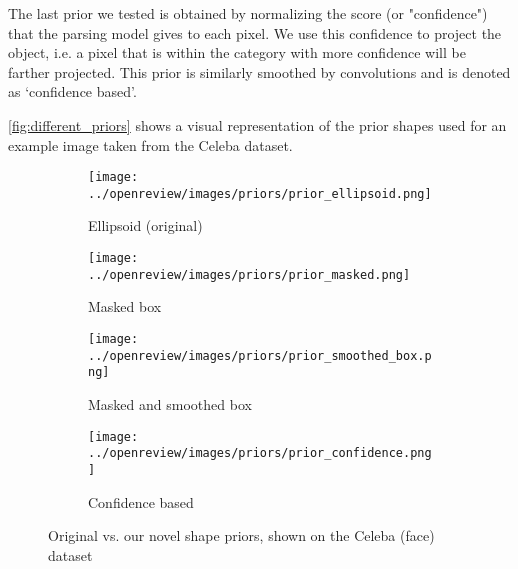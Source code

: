 The last prior we tested is obtained by normalizing the score (or "confidence") that the parsing model gives to each pixel. We use this confidence to project the object, i.e. a pixel that is within the category with more confidence will be farther projected. This prior is similarly smoothed by convolutions and is denoted as `confidence based'. 

\autoref{fig:different_priors} shows a visual representation of the prior shapes used for an example image taken from the Celeba dataset.
\begin{figure}[!htb]
\centering
\begin{subfigure}[t]{0.20\textwidth}
    \texttt{[image: ../openreview/images/priors/prior\_ellipsoid.png]}
    \caption{Ellipsoid (original)}
    \label{}
\end{subfigure}
\begin{subfigure}[t]{0.20\textwidth}
    \texttt{[image: ../openreview/images/priors/prior\_masked.png]}
    \caption{Masked box}
    \label{}
\end{subfigure}
\begin{subfigure}[t]{0.20\textwidth}
    \texttt{[image: ../openreview/images/priors/prior\_smoothed\_box.png]}
    \caption{Masked and  smoothed box
    }
    \label{subfig:c}
\end{subfigure}
\begin{subfigure}[t]{0.20\textwidth}
    \texttt{[image: ../openreview/images/priors/prior\_confidence.png]}
    \caption{Confidence based
    }
    \label{subfig:d}
\end{subfigure}
    \caption{Original vs. our novel shape priors, shown on the Celeba (face) dataset}
    \label{fig:different_priors}
\end{figure}


